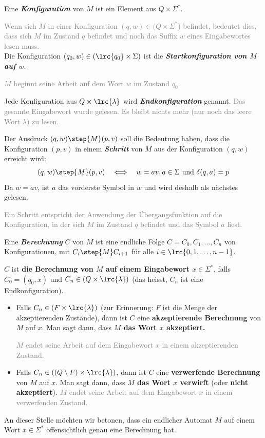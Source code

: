 Eine \textit{\textbf{Konfiguration}} von $M$ ist ein Element aus $Q\times \Sigma^*$.

\textcolor{Gray}{Wenn sich $M$ in einer Konfiguration $(q,w)\in (Q\times \Sigma^*$) befindet, bedeutet dies, dass sich $M$ im Zustand $q$ befindet und noch das Suffix $w$ eines Eingabewortes lesen muss.}\\

Die Konfiguration $(q_0,w)\in (\lrc{q_0}\times \Sigma)$ ist die \textit{\textbf{Startkonfiguration von $M$ auf $w$}}.

\textcolor{Gray}{$M$ beginnt seine Arbeit auf dem Wort $w$ im Zustand $q_0$.}

Jede Konfiguration aus $Q\times\lrc{\lambda}$ wird \textit{\textbf{Endkonfiguration}} genannt.
\textcolor{Gray}{Das gesamte Eingabewort wurde gelesen. Es bleibt nichts mehr (nur noch das leere Wort $\lambda$) zu lesen.}

Der Ausdruck $(q,w)\step{M} (p,v)$ soll die Bedeutung haben, dass die Konfiguration $(p,v)$ in einem \textit{\textbf{Schritt}} von $M$ aus der Konfiguration $(q,w)$ erreicht wird:
\begin{align*}
	(q,w)\step{M} (p,v) \quad \Longleftrightarrow \quad w = av, a\in\Sigma\text{ und } \delta(q,a) = p
\end{align*}
Da $w = av$, ist $a$ das vorderste Symbol in $w$ und wird deshalb als nächstes gelesen.

\textcolor{Gray}{Ein Schritt entspricht der Anwendung der Übergangsfunktion auf die Konfiguration, in der sich $M$ im Zustand $q$ befindet und das Symbol $a$ liest.}

Eine \textit{\textbf{Berechnung}} $C$ von $M$ ist eine endliche Folge $C = C_0, C_1, \ldots , C_n$ von Konfigurationen, mit $C_i\step{M} C_{i+1}$ für alle $i\in\lrc{0,1,\ldots , n-1}$.

$C$ ist \textbf{die Berechnung von $M$ auf einem Eingabewort $x\in\Sigma^*$}, falls $C_0 = (q_0,x)$ und $C_n\in (Q\times \lrc{\lambda})$ (das heisst, $C_n$ ist eine Endkonfiguration).

\begin{itemize}
	\item Falls $C_n\in (F\times \lrc{\lambda})$ (zur Erinnerung: $F$ ist die Menge der akzeptierenden Zustände), dann ist $C$ eine \textbf{akzeptierende Berechnung} von $M$ auf $x$. Man sagt dann, dass \textbf{$M$ das Wort $x$ akzeptiert.}

	      \textcolor{Gray}{$M$ endet seine Arbeit auf dem Eingabewort $x$ in einem akzeptierenden Zustand.}
	\item Falls $C_n\in ((Q\setminus F)\times \lrc{\lambda})$, dann ist $C$ eine \textbf{verwerfende Berechnung} von $M$ auf $x$. Man sagt dann, dass \textbf{$M$ das Wort $x$ verwirft} (oder \textbf{nicht akzeptiert}).
	      \textcolor{Gray}{$M$ endet seine Arbeit auf dem Eingabewort $x$ in einem verwerfenden Zustand.}
\end{itemize}
An dieser Stelle möchten wir betonen, dass ein endlicher Automat $M$ auf einem Wort $x\in\Sigma^*$ offensichtlich genau eine Berechnung hat.

